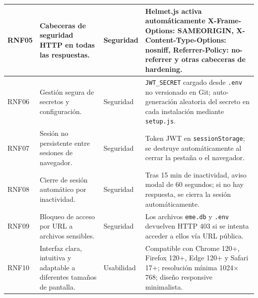 \documentclass[11pt,a4paper]{article}
\begin{document}
\begin{longtable}{|C{1.2cm}|L{5cm}|L{2.5cm}|L{5cm}|}
    RNF05       & Cabeceras de seguridad HTTP en todas las respuestas.                                                     & Seguridad          & Helmet.js activa automáticamente X-Frame-Options: SAMEORIGIN, X-Content-Type-Options: nosniff, Referrer-Policy: no-referrer y otras cabeceras de hardening.                                             \\
    \hline

    RNF06       & Gestión segura de secretos y configuración.                                                              & Seguridad          & \texttt{JWT\_SECRET} cargado desde \texttt{.env} no versionado en Git; auto-generación aleatoria del secreto en cada instalación mediante \texttt{setup.js}.                                            \\
    \hline

    RNF07       & Sesión no persistente entre sesiones de navegador.                                                       & Seguridad          & Token JWT en \texttt{sessionStorage}; se destruye automáticamente al cerrar la pestaña o el navegador.                                                                                                  \\
    \hline

    RNF08       & Cierre de sesión automático por inactividad.                                                             & Seguridad          & Tras 15 min de inactividad, aviso modal de 60 segundos; si no hay respuesta, se cierra la sesión automáticamente.                                                                                       \\
    \hline

    RNF09       & Bloqueo de acceso por URL a archivos sensibles.                                                          & Seguridad          & Los archivos \texttt{eme.db} y \texttt{.env} devuelven HTTP 403 si se intenta acceder a ellos vía URL pública.                                                                                          \\
    \hline

    RNF10       & Interfaz clara, intuitiva y adaptable a diferentes tamaños de pantalla.                                  & Usabilidad         & Compatible con Chrome 120+, Firefox 120+, Edge 120+ y Safari 17+; resolución mínima 1024$\times$768; diseño responsive minimalista.                                                                     \\
    \hline


\end{longtable}
\end{document}
